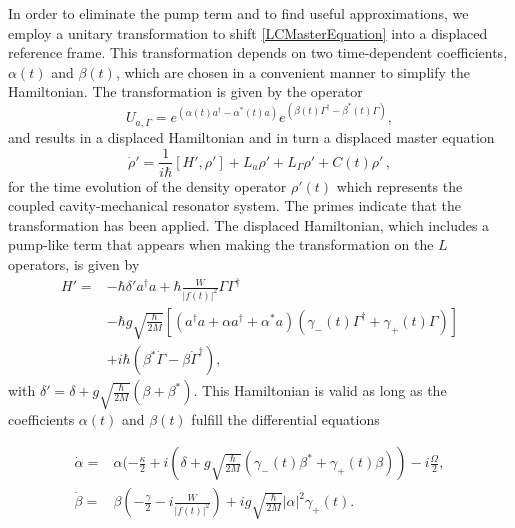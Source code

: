 \documentclass[reprint, amsmath,amssymb, aps,pra]{revtex4-1}
\begin{document}
In order to eliminate the pump term and to find useful
  approximations, we employ a unitary transformation to
shift \eqref{LCMasterEquation} into a displaced reference frame. This
transformation depends on two time-dependent coefficients, $\alpha(t)$
and $\beta(t)$, which are chosen in a convenient manner to simplify
the Hamiltonian. The transformation is given by the operator
\begin{equation}\label{ShiftTransform}
U_{a,\Gamma} = e^{(\alpha(t) a^\dagger - \alpha^*(t)a)}e^{(\beta(t) \Gamma^\dagger - \beta^*(t)\Gamma)},
\end{equation}
and results in a displaced Hamiltonian and in turn a displaced master
equation
\begin{equation}
\dot{\rho}' = \frac{1}{i\hbar}[H',\rho'] +L_a\rho' + L_\Gamma \rho' + C(t)\rho'\, ,
\end{equation}
for the time evolution of the density operator $\rho'(t)$ which
represents the coupled cavity-mechanical resonator system. The primes
indicate that the transformation has been applied. The displaced
Hamiltonian, which includes a pump-like term that appears when making the
transformation on the $L$ operators, is given by
\begin{align*}
  H'=& -\hbar \delta' a^\dagger a + \hbar\frac{W}{|f(t)|^2}\Gamma \Gamma^\dagger\\
     &-\hbar g\sqrt{\frac{\hbar}{2M}}[(a^{\dagger}a +\alpha a^{\dagger}+\alpha^* a)(\gamma_-(t)\Gamma^{\dagger}+\gamma_+(t)\Gamma)]\\
     &+ i\hbar(\beta^*\dot{\Gamma} - \beta \dot{\Gamma}^\dagger),
\end{align*}
with $\delta' = \delta + g\sqrt{\frac{\hbar}{2M}}(\beta + \beta^*)$.
This Hamiltonian is valid as long as the coefficients $\alpha(t)$ and
$\beta(t)$ fulfill the differential equations

\begin{align}
\dot{\alpha} =& \alpha(-\frac{\kappa}{2}+i(\delta+g\sqrt{\frac{\hbar}{2M}}(\gamma_-(t) \beta^* + \gamma_+(t) \beta))-i\frac{\Omega}{2},\\
\dot{\beta} =& \beta(-\frac{\gamma}{2}-i\frac{W}{|f(t)|^2})+ig\sqrt{\frac{\hbar}{2M}}|\alpha|^2\gamma_+(t).
\end{align}
\end{document}
